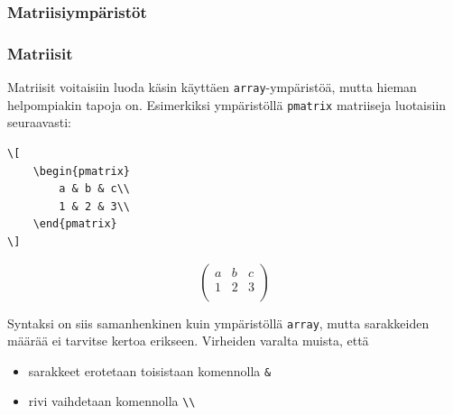 \subsubsection{Matriisiympäristöt}
\begin{frame}[fragile]
    \frametitle{Matriisit}
    Matriisit voitaisiin luoda käsin käyttäen \verb-array--ympäristöä, mutta hieman helpompiakin tapoja on. Esimerkiksi ympäristöllä \verb-pmatrix- matriiseja luotaisiin seuraavasti:

    \begin{minipage}{4cm}
        \begin{scriptsize}
            \begin{Verbatim}[frame=single]
\[
    \begin{pmatrix}
        a & b & c\\
        1 & 2 & 3\\
    \end{pmatrix}
\]
            \end{Verbatim}
        \end{scriptsize}
    \end{minipage}
    \begin{minipage}{4cm}
        \[
            \begin{pmatrix}
                a & b & c\\
                1 & 2 & 3\\
            \end{pmatrix}
        \]
    \end{minipage}

Syntaksi on siis samanhenkinen kuin ympäristöllä \verb-array-, mutta sarakkeiden määrää ei tarvitse kertoa erikseen. Virheiden varalta muista, että
    \begin{itemize}
        \item sarakkeet erotetaan toisistaan komennolla \verb-&-
        \item rivi vaihdetaan komennolla \verb-\\-
    \end{itemize}

\end{frame}
